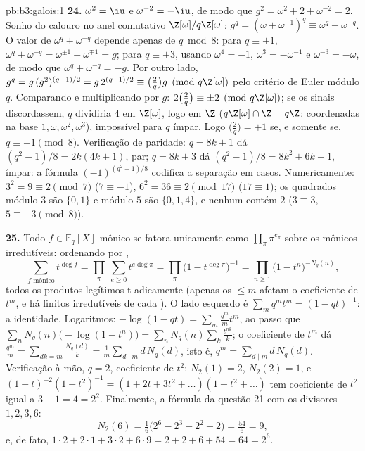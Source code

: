 \begin{solution}{pb:b3:galois:1}
\textbf{24.} $\omega^2 = \iu$ e $\omega^{-2} = -\iu$, de modo que
$g^2 = \omega^2 + 2 + \omega^{-2} = 2$. Sonho do calouro no
anel comutativo $\Z[\omega]/q\Z[\omega]$: $g^q =
(\omega + \omega^{-1})^q \equiv \omega^q + \omega^{-q}$. O
valor de $\omega^q + \omega^{-q}$ depende apenas de $q \bmod 8$:
para $q \equiv \pm1$, $\omega^q + \omega^{-q} = \omega^{\pm1} +
\omega^{\mp1} = g$; para $q \equiv \pm3$, usando $\omega^4 =
-1$, $\omega^{3} = -\omega^{-1}$ e $\omega^{-3} = -\omega$,
de modo que $\omega^q + \omega^{-q} = -g$. Por outro lado, $g^q =
g\,(g^2)^{(q-1)/2} = g\,2^{(q-1)/2} \equiv \bigl(\frac2q\bigr)
g \pmod{q\Z[\omega]}$ pelo critério de Euler módulo $q$. Comparando
e multiplicando por $g$: $2\bigl(\frac2q\bigr) \equiv
\pm2 \pmod{q\Z[\omega]}$; se os sinais discordassem, $q$
dividiria $4$ em $\Z[\omega]$, logo em $\Z$ ($q\Z[\omega] \cap
\Z = q\Z$: coordenadas na base $1, \omega, \omega^2,
\omega^3$), impossível para $q$ ímpar. Logo $\bigl(\frac2q\bigr) =
+1$ se, e somente se, $q \equiv \pm1 \pmod 8$. Verificação de paridade: $q = 8k \pm 1$
dá $(q^2 - 1)/8 = 2k(4k \pm 1)$, par; $q = 8k \pm 3$
dá $(q^2 - 1)/8 = 8k^2 \pm 6k + 1$, ímpar: a fórmula
$(-1)^{(q^2-1)/8}$ codifica a separação em casos. Numericamente: $3^2
= 9 \equiv 2 \pmod 7$ ($7 \equiv -1$), $6^2 = 36 \equiv 2
\pmod{17}$ ($17 \equiv 1$); os quadrados módulo $3$ são $\{0,
1\}$ e módulo $5$ são $\{0, 1, 4\}$, e nenhum contém $2$
($3 \equiv 3$, $5 \equiv -3 \pmod 8$).

\textbf{25.} Todo $f \in \mathbb F_q[X]$ mônico se fatora
unicamente como $\prod_\pi\pi^{e_\pi}$ sobre os mônicos
irredutíveis: ordenando por ,
\[
\sum_{f \text{ mônico}}t^{\deg f}
= \prod_\pi\ \sum_{e \geq 0}t^{e\deg\pi}
= \prod_\pi\bigl(1 - t^{\deg\pi}\bigr)^{-1}
= \prod_{n \geq 1}\bigl(1 - t^n\bigr)^{-N_q(n)},
\]
todos os produtos legítimos t-adicamente (apenas os  $\leq m$
afetam o coeficiente de $t^m$, e há finitos
irredutíveis de cada ). O lado esquerdo é $\sum_m
q^mt^m = (1 - qt)^{-1}$: a identidade. Logaritmos: $-\log(1 -
qt) = \sum_m\frac{q^m}mt^m$, ao passo que $\sum_nN_q(n)\bigl(-\log(1
- t^n)\bigr) = \sum_nN_q(n)\sum_k\frac{t^{nk}}k$; o
coeficiente de $t^m$ dá $\frac{q^m}m = \sum_{dk = m}
\frac{N_q(d)}k = \frac1m\sum_{d \mid m}d\,N_q(d)$, isto é,
$q^m = \sum_{d\mid m}d\,N_q(d)$. Verificação à mão, $q = 2$,
coeficiente de $t^2$: $N_2(1) = 2$, $N_2(2) = 1$, e
$(1 - t)^{-2}(1 - t^2)^{-1} = (1 + 2t + 3t^2 + \dots)(1 + t^2
+ \dots)$ tem coeficiente de $t^2$ igual a $3 + 1 = 4 = 2^2$. Finalmente,
a fórmula da questão 21 com os divisores $1, 2, 3, 6$:
\[
N_2(6) = \tfrac16\bigl(2^6 - 2^3 - 2^2 + 2\bigr)
= \tfrac{54}6 = 9,
\]
e, de fato, $1\cdot2 + 2\cdot1 + 3\cdot2 + 6\cdot9 = 2 + 2 +
6 + 54 = 64 = 2^6$.
\end{solution}
